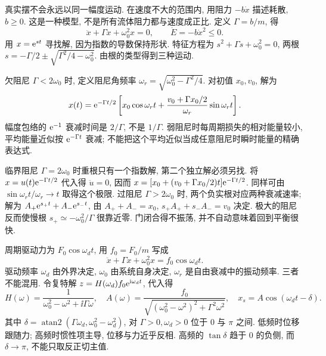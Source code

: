 \label{ch:drive}
真实摆不会永远以同一幅度运动. 在速度不大的范围内, 用阻力 $-b\dot x$ 描述耗散, $b\ge0$. 这是一种模型, 不是所有流体阻力都与速度成正比. 定义 $\Gamma=b/m$, 得
\begin{equation}\label{eq:damp}
\ddot x+\Gamma\dot x+\omega_0^2x=0,\qquad \dot E=-b\dot x^2\le0.
\end{equation}
用 $x=\mathrm e^{st}$ 寻找解, 因为指数的导数保持形状. 特征方程为 $s^2+\Gamma s+\omega_0^2=0$, 两根 $s=-\Gamma/2\pm\sqrt{\Gamma^2/4-\omega_0^2}$. 由根的类型得到三种运动.

欠阻尼 $\Gamma<2\omega_0$ 时, 定义阻尼角频率 $\omega_r=\sqrt{\omega_0^2-\Gamma^2/4}$. 对初值 $x_0,v_0$, 解为
\[
x(t)=\mathrm e^{-\Gamma t/2}\left[x_0\cos\omega_rt+
\frac{v_0+\Gamma x_0/2}{\omega_r}\sin\omega_rt\right].
\]
幅度包络的 $\mathrm e^{-1}$ 衰减时间是 $2/\Gamma$, 不是 $1/\Gamma$. 弱阻尼时每周期损失的相对能量较小, 平均能量近似按 $\mathrm e^{-\Gamma t}$ 衰减; 不能把这个平均近似当成任意阻尼时瞬时能量的精确表达式.

临界阻尼 $\Gamma=2\omega_0$ 时重根只有一个指数解, 第二个独立解必须另找. 将 $x=u(t)\mathrm e^{-\Gamma t/2}$ 代入得 $\ddot u=0$, 因而 $x=[x_0+(v_0+\Gamma x_0/2)t]\mathrm e^{-\Gamma t/2}$. 同样可由 $\sin\omega_rt/\omega_r\to t$ 取得这个极限. 过阻尼 $\Gamma>2\omega_0$ 时, 两个负实根对应两种衰减速率; 解为 $A_+\mathrm e^{s_+t}+A_-\mathrm e^{s_-t}$, 由 $A_++A_-=x_0$, $s_+A_++s_-A_-=v_0$ 决定. 极大的阻尼反而使慢根 $s_+\simeq-\omega_0^2/\Gamma$ 很靠近零. 门闭合得不振荡, 并不自动意味着回到平衡很快.

周期驱动力为 $F_0\cos\omega_dt$, 用 $f_0=F_0/m$ 写成
\begin{equation}\label{eq:driven}
\ddot x+\Gamma\dot x+\omega_0^2x=f_0\cos\omega_dt.
\end{equation}
驱动频率 $\omega_d$ 由外界决定, $\omega_0$ 由系统自身决定, $\omega_r$ 是自由衰减中的振动频率. 三者不能混用. 令复特解 $z=H(\omega_d)f_0\mathrm e^{\mathrm i\omega_dt}$, 代入得
\begin{equation}\label{eq:response}
H(\omega)=\frac1{\omega_0^2-\omega^2+\ii\Gamma\omega},\quad
A(\omega)=\frac{f_0}{\sqrt{(\omega_0^2-\omega^2)^2+\Gamma^2\omega^2}},\quad
x_s=A\cos(\omega_dt-\delta).
\end{equation}
其中 $\delta=\operatorname{atan2}(\Gamma\omega_d,\omega_0^2-\omega_d^2)$, 对 $\Gamma>0,\omega_d>0$ 位于 $0$ 与 $\pi$ 之间. 低频时位移跟随力; 高频时惯性项主导, 位移与力近乎反相. 高频的 $\tan\delta$ 趋于 $0$ 的负侧, 而 $\delta\to\pi$, 不能只取反正切主值.

